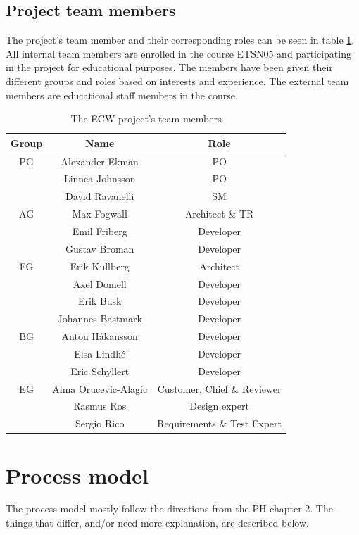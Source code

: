 \documentclass{article}
\begin{document}
\subsection{Project team members}
The project's team member and their corresponding roles can be seen in table \ref{team}. All internal team members are enrolled in the course ETSN05 and participating in the project for educational purposes. The members have been given their different groups and roles based on interests and experience. The external team members are educational staff members in the course.
\begin{table}[h]
    \centering
    \begin{tabular}{|c|c|c|}
    \hline
        Group & Name & Role \\
        \hline \hline
        PG & Alexander Ekman & PO \\ 
        & Linnea Johnsson & PO \\
        & David Ravanelli & SM \\
        \hline
        AG & Max Fogwall & Architect \& TR \\
        & Emil Friberg & Developer \\
        & Gustav Broman & Developer \\
        \hline
        FG & Erik Kullberg & Architect \\
        & Axel Domell & Developer\\ 
        & Erik Busk & Developer \\
        & Johannes Bastmark & Developer\\
        \hline
        BG & Anton Håkansson & Developer\\
        & Elsa Lindhé & Developer\\
        & Eric Schyllert  & Developer\\
        \hline
        EG & Alma Orucevic-Alagic & Customer, Chief \& Reviewer \\
        & Rasmus Ros & Design expert \\
        & Sergio Rico & Requirements \& Test Expert \\
        \hline
    \end{tabular}
    \caption{The ECW project's team members}
    \label{team}
\end{table}

\section{Process model}
The process model mostly follow the directions from the PH chapter 2. The things that differ, and/or need more explanation, are described below.
\end{document}
